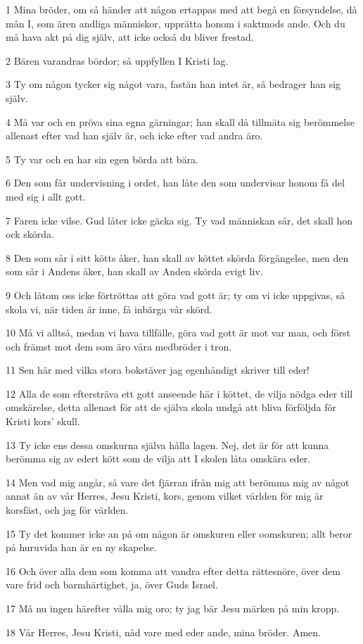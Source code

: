 \par 1 Mina bröder, om så händer att någon ertappas med att begå en försyndelse, då mån I, som ären andliga människor, upprätta honom i saktmods ande. Och du må hava akt på dig själv, att icke också du bliver frestad.
\par 2 Bären varandras bördor; så uppfyllen I Kristi lag.
\par 3 Ty om någon tycker sig något vara, fastän han intet är, så bedrager han sig själv.
\par 4 Må var och en pröva sina egna gärningar; han skall då tillmäta sig berömmelse allenast efter vad han själv är, och icke efter vad andra äro.
\par 5 Ty var och en har sin egen börda att bära.
\par 6 Den som får undervisning i ordet, han låte den som undervisar honom få del med sig i allt gott.
\par 7 Faren icke vilse. Gud låter icke gäcka sig. Ty vad människan sår, det skall hon ock skörda.
\par 8 Den som sår i sitt kötts åker, han skall av köttet skörda förgängelse, men den som sår i Andens åker, han skall av Anden skörda evigt liv.
\par 9 Och låtom oss icke förtröttas att göra vad gott är; ty om vi icke uppgivas, så skola vi, när tiden är inne, få inbärga vår skörd.
\par 10 Må vi alltså, medan vi hava tillfälle, göra vad gott är mot var man, och först och främst mot dem som äro våra medbröder i tron.
\par 11 Sen här med vilka stora bokstäver jag egenhändigt skriver till eder!
\par 12 Alla de som eftersträva ett gott anseende här i köttet, de vilja nödga eder till omskärelse, detta allenast för att de själva skola undgå att bliva förföljda för Kristi kors' skull.
\par 13 Ty icke ens dessa omskurna själva hålla lagen. Nej, det är för att kunna berömma sig av edert kött som de vilja att I skolen låta omskära eder.
\par 14 Men vad mig angår, så vare det fjärran ifrån mig att berömma mig av något annat än av vår Herres, Jesu Kristi, kors, genom vilket världen för mig är korsfäst, och jag för världen.
\par 15 Ty det kommer icke an på om någon är omskuren eller oomskuren; allt beror på huruvida han är en ny skapelse.
\par 16 Och över alla dem som komma att vandra efter detta rättesnöre, över dem vare frid och barmhärtighet, ja, över Guds Israel.
\par 17 Må nu ingen härefter vålla mig oro; ty jag bär Jesu märken på min kropp.
\par 18 Vår Herres, Jesu Kristi, nåd vare med eder ande, mina bröder. Amen.



